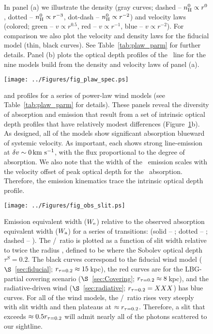 \documentclass[12pt,preprint]{aastex}
\begin{document}
\begin{figure}
\caption{
In panel (a) we illustrate the density (gray curves; dashed -- $n_{\rm H}^0
\propto r^0$, dotted -- $n_{\rm H}^0 \propto r^{-3}$, dot-dash -- $n_{\rm H}^0
\propto r^{-2}$) and velocity laws (colored; green -- $v \propto
r^{0.5}$, red -- $v \propto r^{-1}$, blue -- $v \propto r^{-2}$).  For
comparison we also plot the velocity and density laws for the fiducial
model (thin, black curves).  See Table~\ref{tab:plaw_parm} for further
details.
Panel (b) plots the optical depth profiles of the \mgiia\ line for
the nine models build from the density and velocity laws of panel (a).
}
\label{fig:plaws}
\end{figure}

\begin{figure}
\texttt{[image: ../Figures/fig\_plaw\_spec.ps]}
\caption{
 and  profiles for a series of power-law wind
models (see Table~\ref{tab:plaw_parm} for details).  These panels reveal
the diversity of absorption and emission that result from a set of
intrinsic optical depth profiles that have relatively modest
differences (Figure~\ref{fig:plaws}b).  As designed, all of the models
show significant absorption blueward of systemic velocity.  As
important, each shows strong line-emission at $\delta v \sim 0 \, {\rm km~s^{-1}}$,
with the flux proportional to the degree of absorption.
We also note that the width of the \feiic\ emission scales with the
velocity offset of peak optical depth for the \feiia\ absorption.
Therefore, the emission kinematics trace the intrinsic
optical depth profile.
}
\label{fig:plaws_spec}
\end{figure}


\begin{figure}
\texttt{[image: ../Figures/fig\_obs\_slit.ps]}
\caption{
Emission equivalent width ($W_{\rm e}$) relative to the observed
absorption equivalent width ($W_{\rm a}$) for a series of transitions:
(solid -- \mgiia; dotted -- \mgiib; dashed -- \feiib).  The
\ewe/\ewabs\ ratio is plotted as a function of slit width relative to
twice the radius \rtt, defined to be where the Sobolev optical depth 
$\tau^S = 0.2$.  The black curves correspond to the fiducial wind
model ($\S$~\ref{sec:fiducial}; $r_{\tau = 0.2} \approx 15$\,kpc), the red curves are for the
LBG-partial covering scenario ($\S$~\ref{sec:Covering}; $r_{\tau = 0.2} \approx
8$\,kpc), and the
radiative-driven wind ($\S$~\ref{sec:radiative}; $r_{\tau = 0.2} = XXX$) has blue curves.
For all of the wind models, the \ewe/\ewabs\ ratio rises very steeply
with slit width and then plateaus at $\approx r_{\tau = 0.2}$.  
Therefore, a slit that exceeds $\approx 0.5 r_{\tau = 0.2}$ will admit nearly
all of the photons scattered to our sightline.
}
\label{fig:obs_slit}
\end{figure}
\end{document}
